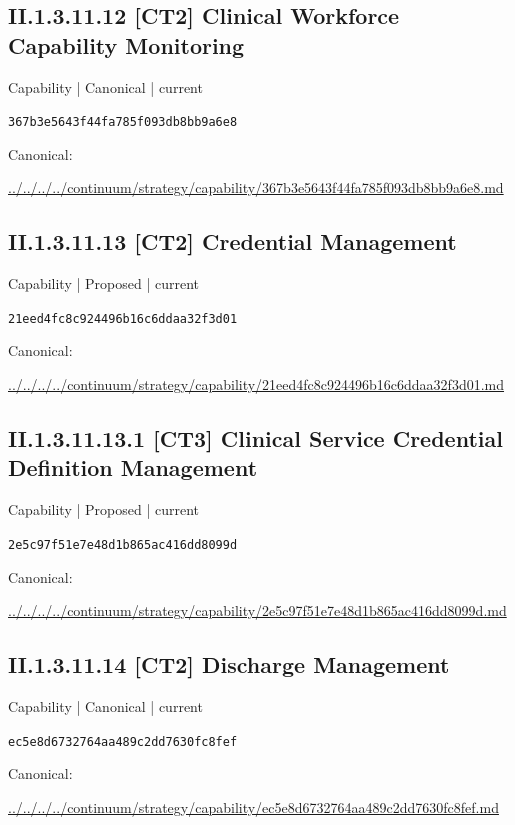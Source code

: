 \documentclass[10pt,a4paper]{article}
\begin{document}
\subsection*{II.1.3.11.12 [CT2] Clinical Workforce Capability Monitoring}
{\small Capability | Canonical | current}\par
\texttt{367b3e5643f44fa785f093db8bb9a6e8}\par
Canonical: \par
{\footnotesize\url{../../../../continuum/strategy/capability/367b3e5643f44fa785f093db8bb9a6e8.md}}\par
\subsection*{II.1.3.11.13 [CT2] Credential Management}
{\small Capability | Proposed | current}\par
\texttt{21eed4fc8c924496b16c6ddaa32f3d01}\par
Canonical: \par
{\footnotesize\url{../../../../continuum/strategy/capability/21eed4fc8c924496b16c6ddaa32f3d01.md}}\par
\subsection*{II.1.3.11.13.1 [CT3] Clinical Service Credential Definition Management}
{\small Capability | Proposed | current}\par
\texttt{2e5c97f51e7e48d1b865ac416dd8099d}\par
Canonical: \par
{\footnotesize\url{../../../../continuum/strategy/capability/2e5c97f51e7e48d1b865ac416dd8099d.md}}\par
\subsection*{II.1.3.11.14 [CT2] Discharge Management}
{\small Capability | Canonical | current}\par
\texttt{ec5e8d6732764aa489c2dd7630fc8fef}\par
Canonical: \par
{\footnotesize\url{../../../../continuum/strategy/capability/ec5e8d6732764aa489c2dd7630fc8fef.md}}\par
\end{document}
